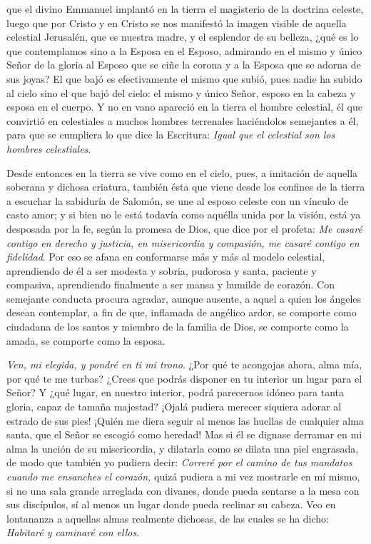 \begin{body}
	 que el divino Emmanuel implantó en la tierra el magisterio de la doctrina celeste, luego que por Cristo y en Cristo se nos manifestó la imagen visible de aquella celestial Jerusalén, que es nuestra madre, y el esplendor de su belleza, ¿qué es lo que contemplamos sino a la Esposa en el Esposo, admirando en el mismo y único Señor de la gloria al Esposo que se ciñe la corona y a la Esposa que se adorna de sus joyas? El que bajó es efectivamente el mismo que subió, pues nadie ha subido al cielo sino el que bajó del cielo: el mismo y único Señor, esposo en la cabeza y esposa en el cuerpo. Y no en vano apareció en la tierra el hombre celestial, él que convirtió en celestiales a muchos hombres terrenales haciéndolos semejantes a él, para que se cumpliera lo que dice la Escritura: \emph{Igual que el celestial son los hombres celestiales}.
	
	Desde entonces en la tierra se vive como en el cielo, pues, a imitación de aquella soberana y dichosa criatura, también ésta que viene desde los confines de la tierra a escuchar la sabiduría de Salomón, se une al esposo celeste con un vínculo de casto amor; y si bien no le está todavía como aquélla unida por la visión, está ya desposada por la fe, según la promesa de Dios, que dice por el profeta: \emph{Me casaré contigo en derecho y justicia, en misericordia y compasión, me casaré contigo en fidelidad}. Por eso se afana en conformarse más y más al modelo celestial, aprendiendo de él a ser modesta y sobria, pudorosa y santa, paciente y compasiva, aprendiendo finalmente a ser mansa y humilde de corazón. Con semejante conducta procura agradar, aunque ausente, a aquel a quien los ángeles desean contemplar, a fin de que, inflamada de angélico ardor, se comporte como ciudadana de los santos y miembro de la familia de Dios, se comporte como la amada, se comporte como la esposa.
	
	\emph{Ven, mi elegida, y pondré en ti mi trono}. ¿Por qué te acongojas ahora, alma mía, por qué te me turbas? ¿Crees que podrás disponer en tu interior un lugar para el Señor? Y ¿qué lugar, en nuestro interior, podrá parecernos idóneo para tanta gloria, capaz de tamaña majestad? ¡Ojalá pudiera merecer siquiera adorar al estrado de sus pies! ¡Quién me diera seguir al menos las huellas de cualquier alma santa, que el Señor se escogió como heredad! Mas si él se dignase derramar en mi alma la unción de su misericordia, y dilatarla como se dilata una piel engrasada, de modo que también yo pudiera decir: \emph{Correré por el camino de tus mandatos cuando me ensanches el corazón,} quizá pudiera a mi vez mostrarle en mí mismo, si no una sala grande arreglada con divanes, donde pueda sentarse a la mesa con sus discípulos, sí al menos un lugar donde pueda reclinar su cabeza. Veo en lontananza a aquellas almas realmente dichosas, de las cuales se ha dicho: \emph{Habitaré y caminaré con ellos}.
\end{body}

